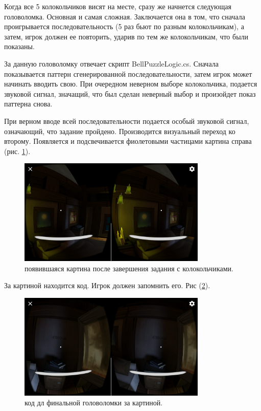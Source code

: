 Когда все 5 колокольчиков висят на месте, сразу же начнется следующая головоломка. Основная и самая сложная. Заключается она в том, что сначала проигрывается последовательность (5 раз бьют по разным колокольчикам), а затем, игрок должен ее повторить, ударив по тем же колокольчикам, что были показаны.

За данную головоломку отвечает скрипт BellPuzzleLogic.cs. Сначала показывается паттерн сгенерированной последовательности, затем игрок может начинать вводить свою. При очередном неверном выборе колокольчика, подается звуковой сигнал, значащий, что был сделан неверный выбор и произойдет показ паттерна снова.

При верном вводе всей последовательности подается особый звуковой сигнал, означающий, что задание пройдено. Производится визуальный переход ко второму. Появляется и подсвечивается фиолетовыми частицами картина справа (рис. \ref{pic}).

\begin{figure}[h!]
    \centering
    \includegraphics[width=0.8\textwidth]{./screenshots/pic.jpg}
    \caption{\small{появившаяся картина после завершения задания с колокольчиками.}}
    \label{pic}
\end{figure} 


За картиной находится код. Игрок  должен запомнить его. Рис (\ref{code}).

\begin{figure}[h!]
    \centering
    \includegraphics[width=0.8\textwidth]{./screenshots/code.jpg}
    \caption{\small{код дл финальной головоломки за картиной.}}
    \label{code}
\end{figure} 

